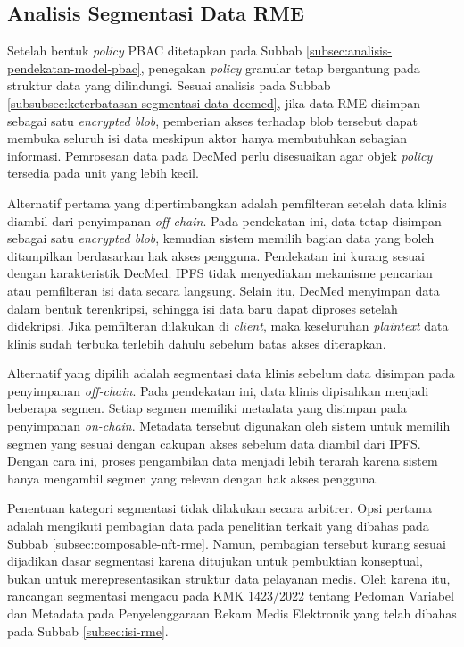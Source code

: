 \subsection{Analisis Segmentasi Data RME}
\label{subsec:analisis-segmentasi-data-rme}

Setelah bentuk \textit{policy} PBAC ditetapkan pada Subbab \ref{subsec:analisis-pendekatan-model-pbac}, penegakan \textit{policy} granular tetap bergantung pada struktur data yang dilindungi. Sesuai analisis pada Subbab \ref{subsubsec:keterbatasan-segmentasi-data-decmed}, jika data RME disimpan sebagai satu \textit{encrypted blob}, pemberian akses terhadap blob tersebut dapat membuka seluruh isi data meskipun aktor hanya membutuhkan sebagian informasi. Pemrosesan data pada DecMed perlu disesuaikan agar objek \textit{policy} tersedia pada unit yang lebih kecil.

Alternatif pertama yang dipertimbangkan adalah pemfilteran setelah data klinis diambil dari penyimpanan \textit{off-chain}. Pada pendekatan ini, data tetap disimpan sebagai satu \textit{encrypted blob}, kemudian sistem memilih bagian data yang boleh ditampilkan berdasarkan hak akses pengguna. Pendekatan ini kurang sesuai dengan karakteristik DecMed. IPFS tidak menyediakan mekanisme pencarian atau pemfilteran isi data secara langsung. Selain itu, DecMed menyimpan data dalam bentuk terenkripsi, sehingga isi data baru dapat diproses setelah didekripsi. Jika pemfilteran dilakukan di \textit{client}, maka keseluruhan \textit{plaintext} data klinis sudah terbuka terlebih dahulu sebelum batas akses diterapkan.

Alternatif yang dipilih adalah segmentasi data klinis sebelum data disimpan pada penyimpanan \textit{off-chain}. Pada pendekatan ini, data klinis dipisahkan menjadi beberapa segmen. Setiap segmen memiliki metadata yang disimpan pada penyimpanan \textit{on-chain}. Metadata tersebut digunakan oleh sistem untuk memilih segmen yang sesuai dengan cakupan akses sebelum data diambil dari IPFS. Dengan cara ini, proses pengambilan data menjadi lebih terarah karena sistem hanya mengambil segmen yang relevan dengan hak akses pengguna.

Penentuan kategori segmentasi tidak dilakukan secara arbitrer. Opsi pertama adalah mengikuti pembagian data pada penelitian terkait yang dibahas pada Subbab \ref{subsec:composable-nft-rme}. Namun, pembagian tersebut kurang sesuai dijadikan dasar segmentasi karena ditujukan untuk pembuktian konseptual, bukan untuk merepresentasikan struktur data pelayanan medis. Oleh karena itu, rancangan segmentasi mengacu pada KMK 1423/2022 tentang Pedoman Variabel dan Metadata pada Penyelenggaraan Rekam Medis Elektronik yang telah dibahas pada Subbab \ref{subsec:isi-rme}.

